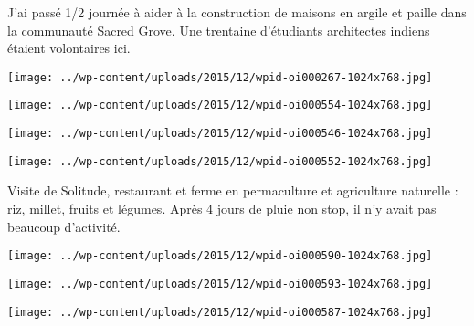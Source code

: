  J'ai passé 1/2 journée à aider à la construction de maisons en argile et paille dans la communauté Sacred Grove. Une trentaine d'étudiants architectes indiens étaient volontaires ici. 
\begin{center} \texttt{[image: ../wp-content/uploads/2015/12/wpid-oi000267-1024x768.jpg]} \end{center}
\begin{center} \texttt{[image: ../wp-content/uploads/2015/12/wpid-oi000554-1024x768.jpg]} \end{center}
\begin{center} \texttt{[image: ../wp-content/uploads/2015/12/wpid-oi000546-1024x768.jpg]} \end{center}
\begin{center} \texttt{[image: ../wp-content/uploads/2015/12/wpid-oi000552-1024x768.jpg]} \end{center}

 Visite de Solitude, restaurant et ferme en permaculture et agriculture naturelle : riz, millet, fruits et légumes. Après 4 jours de pluie non stop, il n'y avait pas beaucoup d'activité. 
\begin{center} \texttt{[image: ../wp-content/uploads/2015/12/wpid-oi000590-1024x768.jpg]} \end{center}
\begin{center} \texttt{[image: ../wp-content/uploads/2015/12/wpid-oi000593-1024x768.jpg]} \end{center}
\begin{center} \texttt{[image: ../wp-content/uploads/2015/12/wpid-oi000587-1024x768.jpg]} \end{center}
